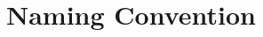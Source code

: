 \documentclass[sigplan,screen]{acmart}
\begin{document}

\appendix


\onecolumn




\section{Naming Convention}
\end{document}
